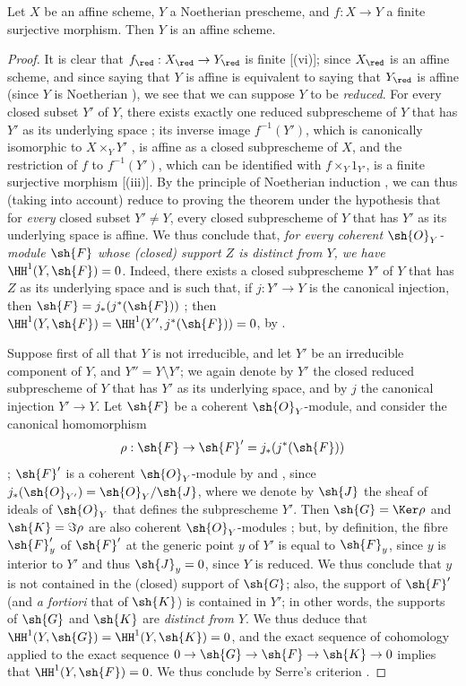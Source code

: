 \begin{theorem}[6.7.1]
\label{II.6.7.1}
Let $X$ be an affine scheme, $Y$ a Noetherian prescheme, and $f:X\to Y$ a finite surjective morphism.
Then $Y$ is an affine scheme.
\end{theorem}

\begin{proof}
It is clear that $f_\red:X_\red\to Y_\red$ is finite [(vi)];
since $X_\red$ is an affine scheme, and since saying that $Y$ is affine is equivalent to saying that $Y_\red$ is affine (since $Y$ is Noetherian ), we see that we can suppose $Y$ to be \emph{reduced}.
For every closed subset $Y'$ of $Y$, there exists exactly one reduced subprescheme of $Y$ that has $Y'$ as its underlying space ;
its inverse image $f^{-1}(Y')$, which is canonically isomorphic to $X\times_Y Y'$ , is affine as a closed subprescheme of $X$, and the restriction of $f$ to $f^{-1}(Y')$, which can be identified with $f\times_Y 1_{Y'}$, is a finite surjective morphism [(iii)].
By the principle of Noetherian induction , we can thus (taking  into account) reduce to proving the theorem under the hypothesis that for \emph{every} closed subset $Y'\neq Y$, every closed subprescheme of $Y$ that has $Y'$ as its underlying space is affine.
We thus conclude that, \emph{for every coherent $\sh{O}_Y$-module $\sh{F}$ whose (closed) support $Z$ is distinct from $Y$, we have $\HH^1(Y,\sh{F})=0$}.
Indeed, there exists a closed subprescheme $Y'$ of $Y$ that has $Z$ as its underlying space and is such that, if $j:Y'\to Y$ is the canonical injection, then $\sh{F}=j_*(j^*(\sh{F}))$ ;
then  $\HH^1(Y,\sh{F})=\HH^1(Y',j^*(\sh{F}))=0$, by .

Suppose first of all that $Y$ is not irreducible, and let $Y'$ be an irreducible component of $Y$, and $Y''=Y\setminus Y'$;
we again denote by $Y'$ the closed reduced subprescheme of $Y$ that has $Y'$ as its underlying space, and by $j$ the canonical injection $Y'\to Y$.
Let $\sh{F}$ be a coherent $\sh{O}_Y$-module, and consider the canonical homomorphism
\[
  \rho : \sh{F}\to\sh{F}' = j_*(j^*(\sh{F}))
\]
;
$\sh{F}'$ is a coherent $\sh{O}_Y$-module by  and , since $j_*(\sh{O}_{Y'})=\sh{O}_Y/\sh{J}$, where we denote by $\sh{J}$ the sheaf of ideals of $\sh{O}_Y$ that defines the subprescheme $Y'$.
Then $\sh{G}=\Ker\rho$ and $\sh{K}=\Im\rho$ are also coherent $\sh{O}_Y$-modules ;
but, by definition, the fibre $\sh{F}'_y$ of $\sh{F}'$ at the generic point $y$ of $Y'$ is equal to $\sh{F}_y$, since $y$ is interior to $Y'$ and thus $\sh{J}_y=0$, since $Y$ is reduced.
We thus conclude that $y$ is not contained in the (closed) support of $\sh{G}$;
also, the support of $\sh{F}'$ (and \emph{a fortiori} that of $\sh{K}$) is contained in $Y'$;
in other words, the supports of $\sh{G}$ and $\sh{K}$ are \emph{distinct from $Y$}.
We thus deduce that $\HH^1(Y,\sh{G})=\HH^1(Y,\sh{K})=0$, and the exact sequence of cohomology applied to the exact sequence $0\to\sh{G}\to\sh{F}\to\sh{K}\to0$ implies that $\HH^1(Y,\sh{F})=0$.
We thus conclude by Serre's criterion .


\end{proof}
